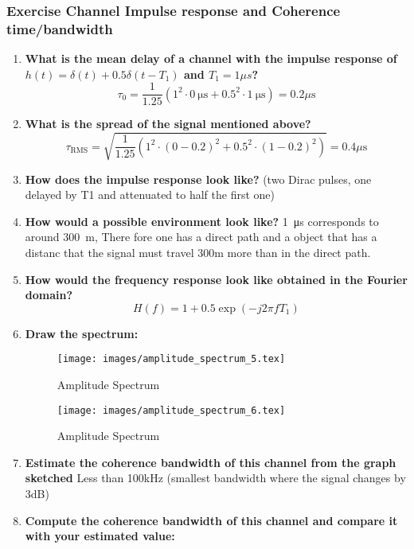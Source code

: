 \subsubsection{Exercise Channel Impulse response and Coherence time/bandwidth}
\begin{enumerate}
    \item \textbf{What is the mean delay of a channel with the impulse response of $h(t)=\delta(t)+0.5 \delta\left(t-T_1\right)$ and $T_1=1\mu s$?}
    $$
    \tau_0=\frac{1}{1.25}\left(1^2\cdot \SI{0}{\micro\second}+0.5^2 \cdot \SI{1}{\micro\second}\right)=0.2 \mu \mathrm{s}
    $$
    \item \textbf{What is the spread of the signal mentioned above?}
    $$
    \tau_{\mathrm{RMS}}=\sqrt{\frac{1}{1.25}\left(1^2\cdot(0-0.2)^2+0.5^2 \cdot(1-0.2)^2\right)}=0.4 \mu \mathrm{s}
    $$
    \item \textbf{How does the impulse response look like?}\newline
    (two Dirac pulses, one delayed by T1 and attenuated to half the first one)
    \item \textbf{How would a possible environment look like?} \newline
    \SI{1}{\micro\second} corresponds to around \SI{300}{\meter}, There fore one has a direct path and a object that has a distanc that the signal must travel 300m more than in the direct path.
    \item \textbf{How would the frequency response look like obtained in the Fourier domain?}
    $$
    H(f)=1+0.5 \exp \left(-j 2 \pi f T_1\right)
    $$
    \item\textbf{ Draw the spectrum:}
    \begin{figure}[ht]
        \centering
        \texttt{[image: images/amplitude\_spectrum\_5.tex]}
        \caption{Amplitude Spectrum}
        \label{fig:amp_spec_5}
    \end{figure}
    \begin{figure}[ht]
        \centering
        \texttt{[image: images/amplitude\_spectrum\_6.tex]}
        \caption{Amplitude Spectrum}
        \label{fig:amp_spec_5}
    \end{figure}
    \FloatBarrier
    \item \textbf{Estimate the coherence bandwidth of this channel from the graph sketched} \newline
    Less than 100kHz (smallest bandwidth where the signal changes by 3dB)
    \item \textbf{Compute the coherence bandwidth of this channel and compare it with your estimated value:}\newline

\end{enumerate}
